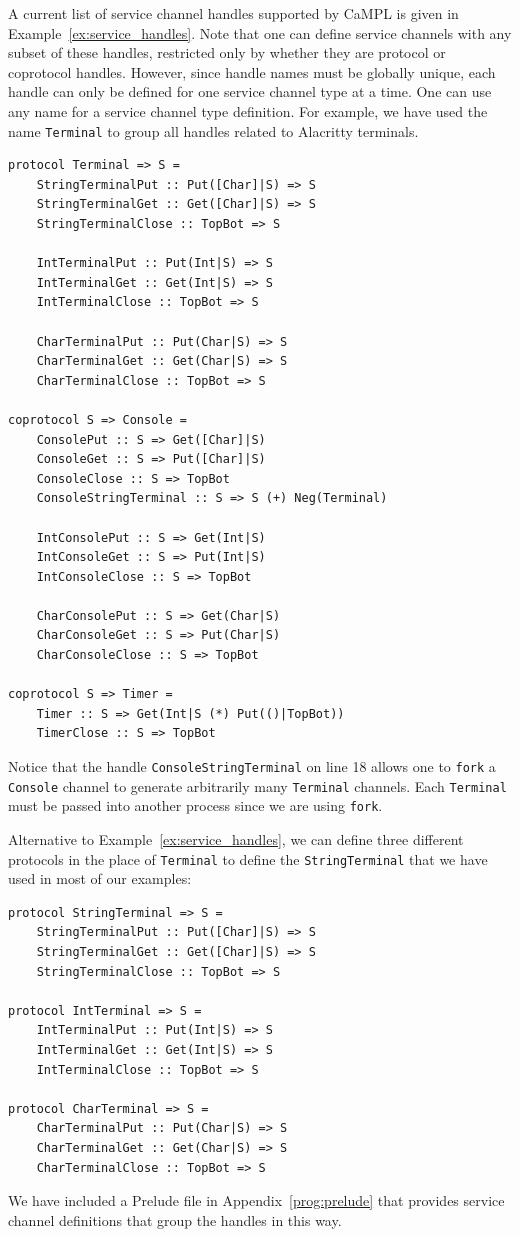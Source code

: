\documentclass[11pt]{article}
\begin{document}
A current list of service channel handles supported by CaMPL is given in Example~\ref{ex:service_handles}.
Note that one can define service channels with any subset of these handles, restricted only by whether they are protocol or coprotocol handles.
However, since handle names must be globally unique, each handle can only be defined for one service channel type at a time.
One can use any name for a service channel type definition.
For example, we have used the name \lstinline{Terminal} to group all handles related to Alacritty terminals.
\begin{lstlisting}[label=ex:service_handles, caption=Complete list of service channel handles]
protocol Terminal => S =
    StringTerminalPut :: Put([Char]|S) => S
    StringTerminalGet :: Get([Char]|S) => S 
    StringTerminalClose :: TopBot => S
    
    IntTerminalPut :: Put(Int|S) => S
    IntTerminalGet :: Get(Int|S) => S 
    IntTerminalClose :: TopBot => S

    CharTerminalPut :: Put(Char|S) => S
    CharTerminalGet :: Get(Char|S) => S 
    CharTerminalClose :: TopBot => S

coprotocol S => Console =
    ConsolePut :: S => Get([Char]|S) 
    ConsoleGet :: S => Put([Char]|S) 
    ConsoleClose :: S => TopBot 
    ConsoleStringTerminal :: S => S (+) Neg(Terminal)

    IntConsolePut :: S => Get(Int|S) 
    IntConsoleGet :: S => Put(Int|S) 
    IntConsoleClose :: S => TopBot 

    CharConsolePut :: S => Get(Char|S) 
    CharConsoleGet :: S => Put(Char|S) 
    CharConsoleClose :: S => TopBot 

coprotocol S => Timer =
    Timer :: S => Get(Int|S (*) Put(()|TopBot))
    TimerClose :: S => TopBot 
\end{lstlisting} 
Notice that the handle \lstinline{ConsoleStringTerminal} on line 18 allows one to \lstinline{fork} a \lstinline{Console} channel to generate arbitrarily many \lstinline{Terminal} channels.
Each \lstinline{Terminal} must be passed into another process since we are using \lstinline{fork}.

Alternative to Example~\ref{ex:service_handles}, we can define three different protocols in the place of \lstinline{Terminal} to define the \lstinline{StringTerminal} that we have used in most of our examples:
\begin{lstlisting}[label=ex:terminal_handles, caption=Three kinds of Terminals]
protocol StringTerminal => S =
    StringTerminalPut :: Put([Char]|S) => S
    StringTerminalGet :: Get([Char]|S) => S 
    StringTerminalClose :: TopBot => S

protocol IntTerminal => S =
    IntTerminalPut :: Put(Int|S) => S
    IntTerminalGet :: Get(Int|S) => S 
    IntTerminalClose :: TopBot => S

protocol CharTerminal => S =
    CharTerminalPut :: Put(Char|S) => S
    CharTerminalGet :: Get(Char|S) => S 
    CharTerminalClose :: TopBot => S
\end{lstlisting} 
We have included a Prelude file in Appendix~\ref{prog:prelude} that provides service channel definitions that group the handles in this way.
\end{document}

